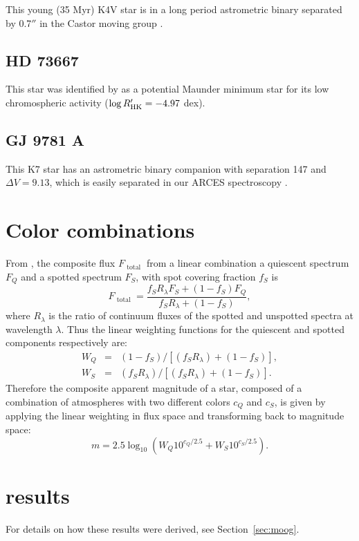\begin{subappendices}
This young (35 Myr) K4V star is in a long period astrometric binary separated by 0.7$''$ in the Castor moving group \citep{Mason2001, Maldonado2010}. 

\subsection{HD 73667}

This star was identified by \citet{Wright2004b} as a potential Maunder minimum star 
\citep{Eddy1976} for its low 
chromospheric activity ($\log R^\prime_\mathrm{HK} = -4.97$ dex).

\subsection{GJ 9781 A}

This K7 star has an astrometric binary companion with separation 147 and $\Delta V = 9.13$, which is easily separated in our ARCES spectroscopy \citep{Lepine2007}. 

\section{Color combinations}

From \citet{Neff1995}, the composite flux $F _ { \text { total } }$ from a linear combination a quiescent spectrum $F_Q$ and a spotted spectrum $F_S$, with spot covering fraction $f_S$ is
\begin{equation}
F _ { \text { total } } = \frac { f _ { S } R _ { \lambda } F _ { S } + \left( 1 - f _ { S } \right) F _ { Q } } { f _ { S } R _ { \lambda } + \left( 1 - f _ { S } \right) }, 
\end{equation}
where $R_\lambda$ is the ratio of continuum fluxes of the spotted and unspotted spectra at wavelength $\lambda$. Thus the linear weighting functions for the quiescent and spotted components respectively are:
\begin{eqnarray}
W _ { Q } &=& \left( 1 - f _ { S } \right) / \left[ \left( f _ { S } R _ { \lambda } \right) + \left( 1 - f _ { S } \right) \right], \\ 
W _ { S } &=& \left( f _ { S } R _ { \lambda } \right) / \left[ \left( f _ { S } R _ { \lambda } \right) + \left( 1 - f _ { S } \right) \right].
\end{eqnarray}
Therefore the composite apparent magnitude of a star, composed of a combination of atmospheres with two different colors $c_Q$ and $c_S$, is given by applying the linear weighting in flux space and transforming back to magnitude space: 
\begin{equation}
m = 2.5 \log_{10}\left( W_Q 10^{c_Q/2.5} + W_S 10^{c_S/2.5} \right). \label{eqn:color}
\end{equation}


\section{\moog results} \label{sec:moogresults}

For details on how these results were derived, see Section~\ref{sec:moog}. 

\startlongtable


\end{subappendices}


%